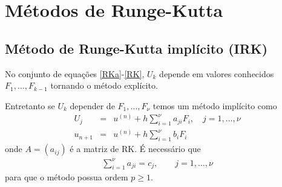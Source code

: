 %
%
%
%
%
%
%




\section{Métodos de Runge-Kutta}%


\subsection{Método de Runge-Kutta implícito (IRK)}
No conjunto de equações \eqref{RKa}-\eqref{RK}, $U_k$ depende em valores conhecidos $F_1,\ldots ,F_{k-1}$ tornando o método explícito.

Entretanto se $U_k$ depender de $F_1,\ldots ,F_\nu $ temos um método implícito como
\begin{eqnarray}\label{IRK}
  U_j &=&u^{(n)}  + h \sum_{i=1}^\nu  a_{ji} F_i, \quad  j=1,\ldots ,\nu \\
  u_{n+1}&=&u^{(n)}  + h \sum_{i=1}^{\nu } b_i F_i
\end{eqnarray}
onde $A=(a_{ij})$ é a matriz de RK. É necessário que
\begin{eqnarray}
 \sum_{i=1}^{\nu } a_{ji} = c_j, \quad \quad  j=1,\ldots ,\nu
\end{eqnarray}
para que o método possua ordem $p\geq 1$.


